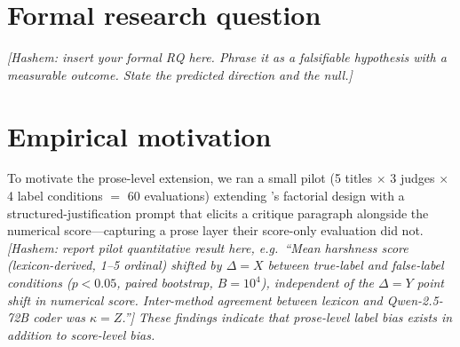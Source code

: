 \documentclass[sigconf,authoryear,nonacm]{acmart}
\begin{document}
\section{Formal research question}
\label{sec:rq}


\textit{[Hashem: insert your formal RQ here. Phrase it as a falsifiable
hypothesis with a measurable outcome. State the predicted direction and
the null.]}

\section{Empirical motivation}
\label{sec:motivation}


To motivate the prose-level extension, we ran a small pilot (5 titles
$\times$ 3 judges $\times$ 4 label conditions $=$ 60 evaluations)
extending \citet{saraf2025quantifying}'s factorial design with a
structured-justification prompt that elicits a critique paragraph
alongside the numerical score---capturing a prose layer their score-only
evaluation did not. \emph{[Hashem: report pilot quantitative
result here, e.g.\ ``Mean harshness score (lexicon-derived, 1--5 ordinal)
shifted by $\Delta = X$ between true-label and false-label conditions
($p < 0.05$, paired bootstrap, $B = 10^4$), independent of the
$\Delta = Y$ point shift in numerical score. Inter-method agreement
between lexicon and Qwen-2.5-72B coder \citep{ashwin2025using,
vallejovera2025llms} was $\kappa = Z$.''] These findings indicate that
prose-level label bias exists in addition to score-level bias.}
\end{document}
